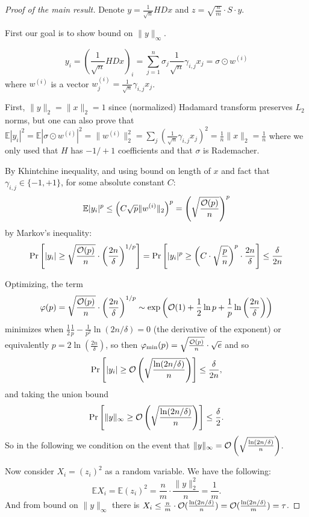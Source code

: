 \documentclass[11pt]{article}
\newcommand{\E}{{\mathbb E}}
\begin{document}
\begin{proof}[Proof of the main result]
Denote $y = \frac{1}{\sqrt{n}}HDx$ and $z = \sqrt{\frac{n}{m}} \cdot S \cdot y$.


First our goal is to show  bound on $\| y \|_{\infty}$.

$$y_i = (\frac{1}{\sqrt{n}}HDx)_i = \sum_{j=1}^n \sigma_j \frac{1}{\sqrt{n}} \gamma_{i,j} x_j = \sigma \odot w^{(i)}$$
where $w^{(i)}$ is a vector $w^{(i)}_j = \frac{1}{\sqrt{n}} \gamma_{i,j}x_j$.

First, $\|y\|_2 = \|x\|_2 = 1$ since (normalized) Hadamard transform preserves $L_2$ norms, but one can also prove that $\E |y_i|^2 = \E | \sigma \odot w^{(i)} |^2  = \|w^{(i)}\|_2^2 = \sum_j (\frac{1}{\sqrt{n}} \gamma_{i,j} x_j)^2 = \frac{1}{n} \|x\|_2 = \frac{1}{n}$ where we only used that $H$ has $-1/+1$ coefficients and that $\sigma$ is Rademacher.


By Khintchine inequality, and using bound on length of $x$ and fact that $\gamma_{i,j} \in \{-1,+1\}$, for some absolute constant $C$:$$\E |y_i|^p \le \left(C \sqrt{p} \| w^{(i)} \|_2\right)^{p} = \left(\sqrt{\frac{\bigo(p)}{n}}\right)^p$$
by Markov's inequality:
$$\Pr\left[ |y_i| \ge \sqrt{\frac{\mathcal{O}(p)}{n}} \cdot \left( \frac{2n}{\delta} \right)^{1/p}\right] = \Pr\left[ |y_i|^p \ge  \left(C \cdot \sqrt{\frac{p}{n}}\right)^p \cdot \frac{2n}{\delta} \right] \le \frac{\delta}{2n}$$

Optimizing, the term
$$\varphi(p) =  \sqrt{\frac{\mathcal{O}(p)}{n}} \cdot \left( \frac{2n}{\delta} \right)^{1/p} \sim \exp\left(\mathcal{O}(1)+\frac{1}{2} \ln p + \frac{1}{p} \ln \left( \frac{2n}{\delta} \right) \right)$$
minimizes when $\frac{1}{2}\frac{1}{p} - \frac{1}{p^2} \ln(2n/\delta)=0$ (the derivative of the exponent) or equivalently $p =  2 \ln \left( \frac{2n}{\delta} \right) $, so then $ \varphi_{\min}(p)= \sqrt{\frac{\mathcal{O}(p)}{n}}\cdot \sqrt{e}$ and so
$$\Pr\left[ |y_i| \ge  \mathcal{O}\left( \sqrt{\frac{\ln (2n/\delta)}{n}} \right)\right] \le \frac{\delta}{2n},$$
and taking the union bound
$$\Pr\left[ \|y\|_\infty \ge  \mathcal{O}\left(\sqrt{\frac{\ln (2n/\delta)}{n}}\right) \right] \le \frac{\delta}{2}.$$
So in the following we condition on the event that $\| y \|_\infty = \mathcal{O}\left(\sqrt{\frac{\ln (2n/\delta)}{n}}\right)$.

Now consider $X_i = (z_i)^2$ as a random variable. We have the following:
$$\E X_i = \E (z_i)^2 = \frac{n}{m} \cdot \frac{\|y\|_2^2}{n} = \frac{1}{m}.$$
And from bound on $\|y\|_\infty$ there is $X_i \le \frac{n}{m} \cdot \mathcal{O}(\frac{\ln(2n/\delta)}{n} )= \mathcal{O}(\frac{\ln(2n/\delta)}{m}) = \tau$.



\end{proof}
\end{document}
